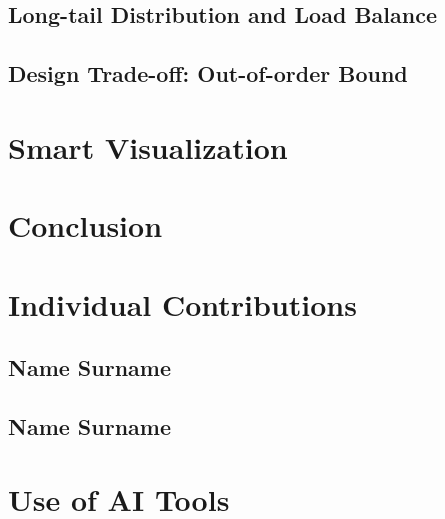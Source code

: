 \documentclass[sigconf,nonacm]{acmart}
\begin{document}
\subsection{Long-tail Distribution and Load Balance}

\subsection{Design Trade-off: Out-of-order Bound}

\section{Smart Visualization}

\section{Conclusion}

\section*{Individual Contributions}
\subsection*{Name Surname}
\subsection*{Name Surname}

\section*{Use of AI Tools}



\end{document}
